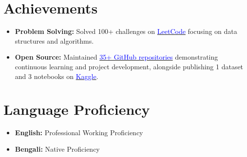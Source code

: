 \documentclass[letterpaper,11pt]{article}
\newcommand{\resumeItem}[1]{
  \item\small{
    {#1 \vspace{-2pt}}
  }
}
\begin{document}
\section{Achievements}
 \begin{itemize}[labelindent=0.15in, leftmargin=*, label=\textbullet, itemsep=1pt, topsep=2pt]
    \resumeItem{\textbf{Problem Solving:} Solved 100+ challenges on \href{https://leetcode.com/u/arka_karmoker/}{\textcolor{blue}{LeetCode}} focusing on data structures and algorithms.}
    \resumeItem{\textbf{Open Source:} Maintained \href{https://github.com/ArkaKarmoker?tab=repositories}{\textcolor{blue}{35+ GitHub repositories}} demonstrating continuous learning and project development, alongside publishing 1 dataset and 3 notebooks on \href{https://www.kaggle.com/arkakarmoker}{\textcolor{blue}{Kaggle}}.}
 \end{itemize}

\section{Language Proficiency}
 \begin{itemize}[labelindent=0.15in, leftmargin=*, label=\textbullet, itemsep=1pt, topsep=2pt]
    \resumeItem{\textbf{English:} Professional Working Proficiency}
    \resumeItem{\textbf{Bengali:} Native Proficiency}
 \end{itemize}

\end{document}
